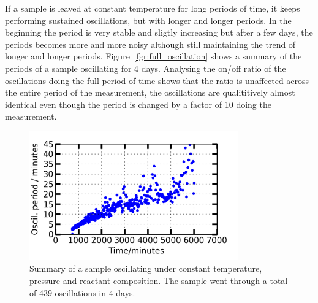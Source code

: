 \documentclass[8.5pt,twoside,twocolumn]{article}
\begin{document}
If a sample is leaved at constant temperature for long periods of time, it keeps performing sustained oscillations, but with longer and longer periods. In the beginning the period is very stable and sligtly increasing but after a few days, the periods becomes more and more noisy although still maintaining the trend of longer and longer periods. Figure~\ref{fgr:full_oscillation} shows a summary of the periods of a sample oscillating for 4 days. Analysing the on/off ratio of the oscillations doing the full period of time shows that the ratio is unaffected across the entire period of the measurement, the oscillations are qualititively almost identical even though the period is changed by a factor of 10 doing the measurement.
\begin{figure}[h]
\centering
  \includegraphics[width=9cm]{summary_of_long_measurement.png}
  \caption{Summary of a sample oscillating under constant temperature, pressure and reactant composition. The sample went through a total of 439 oscillations in 4 days.}
  \label{fgr:long_measurement}
\end{figure}
\end{document}
